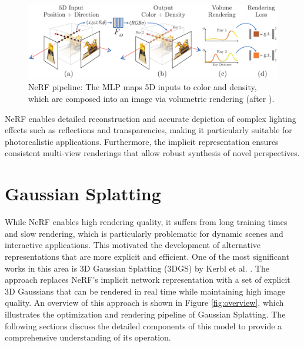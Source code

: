 \begin{figure}[h]
    \centering
    \includegraphics[width=1\linewidth]{Grafiken/Fundamentals/pipeline.pdf}
    \caption{NeRF pipeline: The MLP maps 5D inputs to color and density, which are composed into an image via volumetric rendering (after \cite{mildenhall2021nerf}).}
    \label{fig:nerf_pipeline}
\end{figure}

NeRF enables detailed reconstruction and accurate depiction of complex lighting effects such as reflections and transparencies, making it particularly suitable for photorealistic applications.
Furthermore, the implicit representation ensures consistent multi-view renderings that allow robust synthesis of novel perspectives.


\section{Gaussian Splatting}

While NeRF enables high rendering quality, it suffers from long training times and slow rendering, which is particularly problematic for dynamic scenes and interactive applications.
This motivated the development of alternative representations that are more explicit and efficient.
One of the most significant works in this area is 3D Gaussian Splatting (3DGS) by Kerbl et al. \cite{kerbl3Dgaussians}.
The approach replaces NeRF’s implicit network representation with a set of explicit 3D Gaussians that can be rendered in real time while maintaining high image quality.
An overview of this approach is shown in Figure \ref{fig:overview}, which illustrates the optimization and rendering pipeline of Gaussian Splatting.
The following sections discuss the detailed components of this model to provide a comprehensive understanding of its operation.

